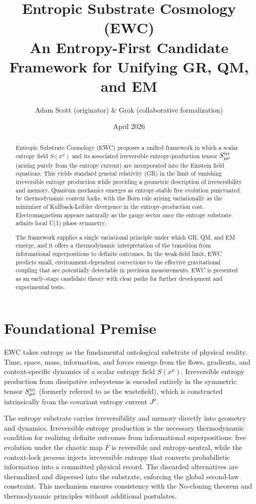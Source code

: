 \documentclass[11pt,letterpaper]{article}
\title{Entropic Substrate Cosmology (EWC)\\ An Entropy-First Candidate Framework for Unifying GR, QM, and EM}
\author{Adam Scott (originator) \& Grok (collaborative formalization)}
\date{April 2026}
\begin{document}
\maketitle

\begin{abstract}
Entropic Substrate Cosmology (EWC) proposes a unified framework in which a scalar entropy field \(S(x^\mu)\) and its associated irreversible entropy-production tensor \(S_{\mu\nu}^{\rm irr}\) (arising purely from the entropy current) are incorporated into the Einstein field equations. This yields standard general relativity (GR) in the limit of vanishing irreversible entropy production while providing a geometric description of irreversibility and memory. Quantum mechanics emerges as entropy-stable free evolution punctuated by thermodynamic context locks, with the Born rule arising variationally as the minimizer of Kullback-Leibler divergence in the entropy-production cost. Electromagnetism appears naturally as the gauge sector once the entropy substrate admits local U(1) phase symmetry.

The framework supplies a single variational principle under which GR, QM, and EM emerge, and it offers a thermodynamic interpretation of the transition from informational superpositions to definite outcomes. In the weak-field limit, EWC predicts small, environment-dependent corrections to the effective gravitational coupling that are potentially detectable in precision measurements. EWC is presented as an early-stage candidate theory with clear paths for further development and experimental tests.
\end{abstract}

\section{Foundational Premise}
EWC takes entropy as the fundamental ontological substrate of physical reality. Time, space, mass, information, and forces emerge from the flows, gradients, and context-specific dynamics of a scalar entropy field \(S(x^\mu)\). Irreversible entropy production from dissipative subsystems is encoded entirely in the symmetric tensor \(S_{\mu\nu}^{\rm irr}\) (formerly referred to as the wastefield), which is constructed intrinsically from the covariant entropy current \(J^\mu\).

The entropy substrate carries irreversibility and memory directly into geometry and dynamics. Irreversible entropy production is the necessary thermodynamic condition for realizing definite outcomes from informational superpositions: free evolution under the chaotic map \(F\) is reversible and entropy-neutral, while the context-lock process injects irreversible entropy that converts probabilistic information into a committed physical record. The discarded alternatives are thermalized and dispersed into the substrate, enforcing the global second-law constraint. This mechanism ensures consistency with the No-cloning theorem and thermodynamic principles without additional postulates.
\end{document}
